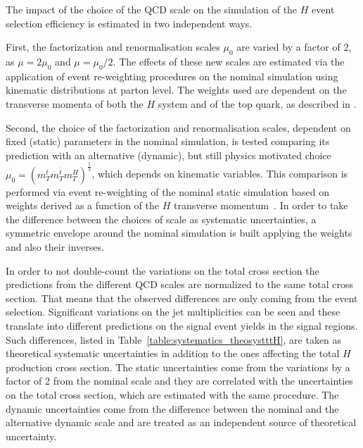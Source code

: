 The impact of the choice of the QCD scale on the simulation of the \ttbar$H$ event selection efficiency is estimated in two independent ways. 

First, the factorization and renormalisation scales $\mu_{0}$ are varied by a factor of 2, as $\mu = 2\mu_{0}$ and $\mu = \mu_{0}/2$. The effects of these new scales are estimated via the application of event re-weighting procedures on the nominal simulation using kinematic distributions at parton level. The weights used are dependent on the transverse momenta of both the \ttbar$H$ system and of the top quark, as described in \cite{Guindon:1638000}. 

Second, the choice of the factorization and renormalisation scales, dependent on fixed (static) parameters in the nominal simulation, is tested comparing its prediction with an alternative (dynamic), but still physics motivated choice $\mu_{0} = (m_{T}^{t}m_{T}^{\bar{t}}m_{T}^{H})^{\frac{1}{3}}$, which depends on kinematic variables. This comparison is performed via event re-weighting of the nominal static simulation based on weights derived as a function of the \ttbar$H$ transverse momentum~\cite{Guindon:1638000}. In order to take the difference between the choices of scale as systematic uncertainties, a symmetric envelope around the nominal simulation is built applying the weights and also their inverses.

In order to not double-count the variations on the total cross section the predictions from the different QCD scales are normalized to the same total cross section. That means that the observed differences are only coming from the event selection.
Significant variations on the jet multiplicities can be seen and these translate into different predictions on the signal event yields in the signal regions. Such differences, listed in Table~\ref{table:systematics_theosystttH}, are taken as theoretical systematic uncertainties in addition to the ones affecting the total \ttbar$H$ production cross section. The static uncertainties come from the variations by a factor of 2 from the nominal scale and they are correlated with the uncertainties on the total cross section, which are estimated with the same procedure. The dynamic uncertainties come from the difference between the nominal and the alternative dynamic scale and are treated as an independent source of theoretical uncertainty. 

